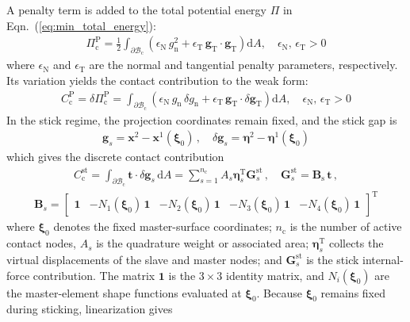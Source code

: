 \documentclass[review, authoryear, 12pt]{elsarticle}
\begin{document}
A penalty term is added to the total potential energy $\Pi$ in Eqn.~(\ref{eq:min_total_energy}):
\begin{align}
    \Pi_{\text{c}}^{\text{P}} = \frac{1}{2} \int_{\partial \bm{\mathcal{B}}_{\text{c}}} 
    \left( 
        \epsilon_{\text{N}} \, g_{\text{n}}^2 + \epsilon_{\text{T}} \, \mathbf{g}_{\text{T}} \cdot \mathbf{g}_{\text{T}} 
    \right) \text{d}A, 
    \quad \epsilon_{\text{N}}, \, \epsilon_{\text{T}} > 0 \label{eq:Pi_cPenalty} %
\end{align}
where $\epsilon_{\text{N}}$ and $\epsilon_{\text{T}}$ are the normal and tangential penalty parameters, respectively. Its variation yields the contact contribution to the weak form:
\begin{align}
    C_{\text{c}}^{\text{P}} = \delta \Pi_{\text{c}}^{\text{P}} = \int_{\partial \bm{\mathcal{B}}_{\text{c}}} 
    \left( 
    \epsilon_{\text{N}} \, g_{\text{n}} \, \delta g_{\text{n}} + \epsilon_{\text{T}} \, \mathbf{g}_{\text{T}} \cdot \delta \mathbf{g}_{\text{T}} 
    \right) \text{d}A, 
    \quad \epsilon_{\text{N}}, \, \epsilon_{\text{T}} > 0  \label{eq:varation_Pi_cPenalty} %
\end{align}
In the stick regime, the projection coordinates remain fixed, and the stick gap is
\begin{align}
    \mathbf{g}_s = \mathbf{x}^2 - \mathbf{x}^1(\bm{\xi}_0) \,,
        \quad \delta \mathbf{g}_s = \bm{\eta}^2 - \bm{\eta}^1(\bm{\xi}_0)
\end{align}
which gives the discrete contact contribution
\begin{align}
    C_{\text{c}}^{\text{st}} = \int_{\partial \bm{\mathcal{B}}_{\text{c}}} \mathbf{t} \cdot \delta \mathbf{g}_s \, \text{d}A
        = \sum_{s=1}^{n_{\text{c}}} A_s \bm{\eta}_s^{\text{T}} \mathbf{G}_s^{\text{st}} \,, \quad
        \mathbf{G}_s^{\text{st}} = \mathbf{B}_{\text{s}} \, \mathbf{t} \,,
\end{align}
\begin{align}
    \mathbf{B}_s = 
    \begin{bmatrix}
        \mathbf{1} &
        -N_1(\bm{\xi}_0) \, \mathbf{1} &
        -N_2(\bm{\xi}_0) \, \mathbf{1} &
        -N_3(\bm{\xi}_0) \, \mathbf{1} &
        -N_4(\bm{\xi}_0) \, \mathbf{1}
    \end{bmatrix}^{\mathrm{T}} %
\end{align}
where $\bm{\xi}_0$ denotes the fixed master-surface coordinates; $n_{\text{c}}$ is the number of active contact nodes, $A_s$ is the quadrature weight or associated area; $\bm{\eta}_s^{\text{T}}$ collects the virtual displacements of the slave and master nodes; and $\mathbf{G}_s^{\text{st}}$ is the stick internal-force contribution. The matrix $\mathbf{1}$ is the $3 \times 3$ identity matrix, and $N_i(\bm{\xi}_0)$ are the master-element shape functions evaluated at $\bm{\xi}_0$. Because $\bm{\xi}_0$ remains fixed during sticking, linearization gives
\end{document}

